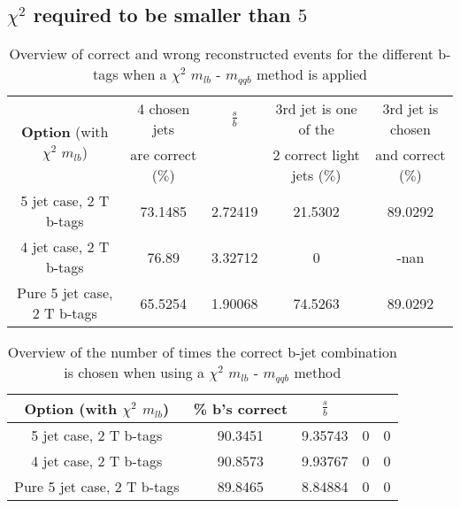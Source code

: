 \documentclass[a4paper,12pt]{report}
\begin{document}
\subsection{$\chi^{2}$ required to be smaller than $5$}
  \begin{table}[!h] 
 \begin{tabular}{c|c|c|c|c} 
\multirow{2}{*}{\textbf{Option} (with $\chi^{2}$ $m_{lb}$)} & 4 chosen jets & $\frac{s}{b}$ & 3rd jet is one of the & 3rd jet is chosen \\ & are correct ($\%$)    & 	             & 2 correct light jets ($\%$) &  and correct ($\%$)	  \\ \hline 
 5 jet case,      2 T b-tags              & 73.1485 & 2.72419 & 21.5302 & 89.0292 \\ 
 4 jet case,      2 T b-tags              & 76.89 & 3.32712 & 0 & -nan \\ 
 Pure 5 jet case, 2 T b-tags              & 65.5254 & 1.90068 & 74.5263 & 89.0292 \\ 
 \end{tabular} 
 \caption{Overview of correct and wrong reconstructed events for the different b-tags when a $\chi^{2}$ $m_{lb}$ - $m_{qqb}$ method is applied} 
 \end{table} 
 
 \begin{table}[!h] 
 \begin{tabular}{c|c|c|c|c} 
 \textbf{Option} (with $\chi^{2}$ $m_{lb}$) & \% b's correct   & $\frac{s}{b}$ &  &  \\ \hline 
 5 jet case,      2 T b-tags              & 90.3451 & 9.35743 & 0 & 0 \\ 
 4 jet case,      2 T b-tags              & 90.8573 & 9.93767 & 0 & 0 \\ 
 Pure 5 jet case, 2 T b-tags              & 89.8465 & 8.84884 & 0 & 0 \\ 
 \end{tabular} 
 \caption{Overview of the number of times the correct b-jet combination is chosen when using a $\chi^{2}$ $m_{lb}$ - $m_{qqb}$ method} 
 \end{table} 
 
\end{document}
